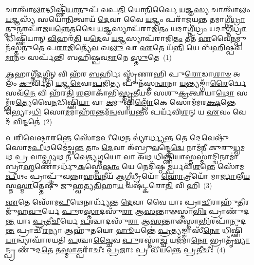 \setcounter{anuvakam}{0}
𑌚𑌾𑌤𑍍𑌵𑌾᳴\-\ul{𑌲𑌾}\-𑌦𑍍𑌧𑌿𑌷𑍍𑌣𑌿᳴\-\ul{𑌯𑌾}\-𑌨𑍁𑌪᳴ 𑌵𑌪\-\ul{𑌤𑌿} 𑌯𑍋\-\ul{𑌨𑌿}\-𑌰𑍍𑌵𑍈 \ul{𑌯}\-𑌜𑍍𑌞\-\ul{𑌸𑍍𑌯} 𑌚𑌾𑌤𑍍𑌵𑌾᳴𑌲𑌂 \ul{𑌯}\-𑌜𑍍𑌞𑌸𑍍𑌯᳴ 𑌸𑌯𑍋\-\ul{𑌨𑌿}\-𑌤𑍍𑌵𑌾𑌯᳴ \ul{𑌦𑍇}\-𑌵𑌾 𑌵𑍈 \ul{𑌯}\-𑌜𑍍𑌞𑌂 𑌪𑌰𑌾᳴𑌜𑌯\-\ul{𑌨𑍍𑌤} 𑌤𑌮𑌾𑌗𑍍𑌨𑍀॑\-\ul{𑌧𑍍𑌰𑌾}\-𑌤𑍍𑌪𑍁\-\ul{𑌨}\-𑌰𑌪𑌾᳴𑌜𑌯\-\ul{𑌨𑍍𑌨𑍇}\-𑌤𑌦𑍍𑌵𑍈 \ul{𑌯}\-𑌜𑍍𑌞𑌸𑍍𑌯𑌾𑌪᳴𑌰𑌾𑌜𑌿\-\ul{𑌤𑌂} 𑌯𑌦𑌾𑌗𑍍𑌨𑍀॑\-\ul{𑌧𑍍𑌰𑌂} 𑌯𑌦𑌾𑌗𑍍𑌨𑍀॑\-\ul{𑌧𑍍𑌰𑌾}\-𑌦𑍍𑌧𑌿𑌷𑍍𑌣𑌿᳴𑌯𑌾𑌨𑍍 \ul{𑌵𑌿}\-𑌹𑌰᳴\-\ul{𑌤𑌿} 𑌯\-\ul{𑌦𑍇}\-𑌵 \ul{𑌯}\-𑌜𑍍𑌞𑌸𑍍𑌯𑌾𑌪᳴𑌰𑌾𑌜𑌿\-\ul{𑌤𑌂} 𑌤𑌤᳴ \ul{𑌏}\-𑌵𑍈\-\ul{𑌨}\-𑌮𑍍𑌪𑍁𑌨᳴𑌸𑍍𑌤𑌨𑍁𑌤𑍇 𑌪\-\ul{𑌰𑌾}\-𑌜𑌿𑌤𑍍𑌯𑍇᳴\-\ul{𑌵} 𑌖\-\ul{𑌲𑍁} 𑌵𑌾 \ul{𑌏}\-𑌤𑍇 𑌯᳴\-\ul{𑌨𑍍𑌤𑌿} 𑌯𑍇 𑌬᳴𑌹𑌿𑌷𑍍𑌪𑌵\-\ul{𑌮𑌾}\-𑌨𑍞 𑌸𑌰𑍍𑌪᳴𑌨𑍍𑌤𑌿 𑌬𑌹𑌿𑌷𑍍𑌪𑌵\-\ul{𑌮𑌾}\-𑌨𑍇 \ul{𑌸𑍍𑌤𑍁}\-𑌤𑍇~(1)

\-\ul{𑌆}\-𑌹𑌾𑌗𑍍𑌨𑍀᳴\-\ul{𑌦}\-𑌗𑍍𑌨𑍀𑌨𑍍 𑌵𑌿 𑌹᳴𑌰 \ul{𑌬}\-𑌰𑍍\mbox{}𑌹𑌿𑌃 𑌸𑍍𑌤𑍃᳴𑌣𑌾𑌹𑌿 𑌪𑍁\-\ul{𑌰𑍋}\-𑌡𑌾\-\ul{𑌶𑌾}\-\-\ul{𑍞} 𑌅𑌲𑌂᳴ \ul{𑌕𑍁}\-𑌰𑍍𑌵𑌿𑌤𑌿᳴ \ul{𑌯}\-𑌜𑍍𑌞\-\ul{𑌮𑍇}\-𑌵𑌾\-\ul{𑌪}\-𑌜𑌿\-\ul{𑌤𑍍𑌯} 𑌪𑍁𑌨᳴𑌸𑍍𑌤\-\ul{𑌨𑍍𑌵𑌾}\-𑌨𑌾 \ul{𑌯}\-𑌨𑍍𑌤𑍍𑌯𑌙𑍍𑌗𑌾᳴\-\ul{𑌰𑍈}\-𑌰𑍍𑌦𑍍𑌵𑍇 𑌸𑌵᳴\-\ul{𑌨𑍇} 𑌵𑌿 𑌹᳴𑌰𑌤𑌿 \ul{𑌶}\-𑌲𑌾𑌕𑌾᳴𑌭𑌿\-\ul{𑌸𑍍𑌤𑍃}\-𑌤𑍀𑌯𑍞᳴ 𑌸𑌶𑍁\-\ul{𑌕𑍍𑌰}\-𑌤𑍍𑌵𑌾𑌯𑌾\-\ul{𑌥𑍋} 𑌸𑌮𑍍𑌭᳴𑌰\-\ul{𑌤𑍍𑌯𑍇}\-𑌵𑍈\-\ul{𑌨}\-𑌦𑍍𑌧𑌿𑌷𑍍𑌣𑌿᳴\-\ul{𑌯𑌾} 𑌵𑌾 \ul{𑌅}\-𑌮𑍁𑌷𑍍𑌮𑌿᳴\-\ul{𑌲𑍍𑌲𑍋𑌁}\-𑌕𑍇 𑌸𑍋𑌮᳴𑌮𑌰\-\ul{𑌕𑍍𑌷}\-𑌨𑍍𑌤𑍇𑌭𑍍𑌯𑍋\-𑌽\-\ul{𑌧𑌿} 𑌸𑍋\-\ul{𑌮}\-𑌮𑌾𑌹᳴\-\ul{𑌰}\-𑌨𑍍𑌤𑌮᳴\-\ul{𑌨𑍍𑌵}\-𑌵𑌾\-\ul{𑌯}\-𑌨𑍍𑌤𑌂 𑌪𑌰𑍍𑌯᳴𑌵𑌿\-\ul{𑌶}\-𑌨𑍍 𑌯 \ul{𑌏}\-𑌵𑌂 𑌵𑍇𑌦᳴ \ul{𑌵𑌿}\-𑌨𑍍𑌦𑌤𑍇॑~(2)

\-\ul{𑌪}\-\-\ul{𑌰𑌿}\-\-\ul{𑌵𑍇}\-𑌷𑍍𑌟𑌾\-\ul{𑌰}\-𑌨𑍍𑌤𑍇 𑌸𑍋᳴𑌮\-\ul{𑌪𑍀}\-𑌥𑍇\-\ul{𑌨} 𑌵𑍍𑌯𑌾॑𑌰𑍍𑌧𑍍𑌯\-\ul{𑌨𑍍𑌤} 𑌤𑍇 \ul{𑌦𑍇}\-𑌵𑍇𑌷𑍁᳴ 𑌸𑍋𑌮\-\ul{𑌪𑍀}\-𑌥𑌮𑍈॑𑌚𑍍𑌛\-\ul{𑌨𑍍𑌤} 𑌤𑌾𑌂 \ul{𑌦𑍇}\-𑌵𑌾 𑌅᳴𑌬𑍍𑌰𑍁\-\ul{𑌵}\-𑌨𑍍𑌦𑍍𑌵𑍇\-\ul{𑌦𑍍𑌵𑍇} 𑌨𑌾𑌮᳴𑌨𑍀 𑌕𑍁𑌰𑍁\-\ul{𑌧𑍍𑌵}\-𑌮\-\ul{𑌥} 𑌪𑍍𑌰 \ul{𑌵𑌾}\-𑌫𑍍𑌸𑍍𑌯\-\ul{𑌥} 𑌨 𑌵𑍇\-\ul{𑌤𑍍𑌯}\-𑌗𑍍𑌨\-\ul{𑌯𑍋} 𑌵𑌾 𑌅\-\ul{𑌥} 𑌧𑌿𑌷𑍍𑌣𑌿᳴\-\ul{𑌯𑌾}\-𑌸𑍍𑌤𑌸𑍍𑌮𑌾॑\-\ul{𑌦𑍍𑌦𑍍𑌵𑌿}\-𑌨𑌾𑌮𑌾॑ 𑌬𑍍𑌰𑌾\-\ul{𑌹𑍍𑌮}\-𑌣𑍋\-𑌽𑌰𑍍𑌧𑍁᳴\-\ul{𑌕}\-𑌸𑍍𑌤𑍇\-\ul{𑌷𑌾𑌂} 𑌯𑍇 𑌨𑍇𑌦𑌿᳴𑌷𑍍𑌠\-\ul{𑌮𑍍𑌪}\-𑌰𑍍𑌯𑌵𑌿᳴\-\ul{𑌶}\-𑌨𑍍𑌤𑍇 𑌸𑍋᳴𑌮\-\ul{𑌪𑍀}\-𑌥𑌂 𑌪𑍍𑌰𑌾𑌪𑍍𑌨𑍁᳴𑌵𑌨𑍍𑌨𑌾𑌹\-\ul{𑌵}\-𑌨𑍀𑌯᳴ 𑌆\-\ul{𑌗𑍍𑌨𑍀}\-𑌧𑍍𑌰𑍀𑌯𑍋᳴ \ul{𑌹𑍋}\-𑌤𑍍𑌰𑍀𑌯𑍋᳴ 𑌮𑌾\-\ul{𑌰𑍍𑌜𑌾}\-𑌲𑍀\-\ul{𑌯}\-𑌸𑍍𑌤\-\ul{𑌸𑍍𑌮𑌾}\-𑌤𑍍𑌤𑍇𑌷𑍁᳴ 𑌜𑍁𑌹𑍍𑌵𑌤𑍍𑌯\-\ul{𑌤𑌿}\-𑌹𑌾\-\ul{𑌯} 𑌵𑌷᳴𑌟𑍍𑌕𑌰𑍋\-\ul{𑌤𑌿} 𑌵𑌿 𑌹𑌿~(3)

\-\ul{𑌏}\-𑌤𑍇 𑌸𑍋᳴𑌮\-\ul{𑌪𑍀}\-𑌥𑍇𑌨𑌾𑌰𑍍𑌧𑍍𑌯᳴𑌨𑍍𑌤 \ul{𑌦𑍇}\-𑌵𑌾 𑌵𑍈 𑌯𑌾𑌃 𑌪𑍍𑌰𑌾\-\ul{𑌚𑍀}\-𑌰𑌾𑌹𑍁᳴\-\ul{𑌤𑍀}\-𑌰𑌜𑍁᳴𑌹\-\ul{𑌵𑍁}\-𑌰𑍍𑌯𑍇 \ul{𑌪𑍁}\-𑌰\-\ul{𑌸𑍍𑌤𑌾}\-𑌦𑌸𑍁᳴\-\ul{𑌰𑌾} 𑌆\-\ul{𑌸}\-𑌨𑍍𑌤𑌾𑍟𑌸𑍍𑌤𑌾\-\ul{𑌭𑌿𑌃} 𑌪𑍍𑌰𑌾𑌣𑍁᳴𑌦\-\ul{𑌨𑍍𑌤} 𑌯𑌾𑌃 \ul{𑌪𑍍𑌰}\-𑌤𑍀\-\ul{𑌚𑍀}\-𑌰𑍍𑌯𑍇 \ul{𑌪}\-𑌶𑍍𑌚𑌾𑌦𑌸𑍁᳴\-\ul{𑌰𑌾} 𑌆\-\ul{𑌸}\-𑌨𑍍𑌤𑌾𑍟𑌸𑍍𑌤𑌾\-\ul{𑌭𑌿}\-𑌰𑌪𑌾᳴𑌨𑍁𑌦\-\ul{𑌨𑍍𑌤} 𑌪𑍍𑌰𑌾𑌚𑍀᳴\-\ul{𑌰}\-𑌨𑍍𑌯𑌾 𑌆𑌹𑍁᳴𑌤𑌯𑍋 \ul{𑌹𑍂}\-𑌯𑌨𑍍𑌤𑍇॑ \ul{𑌪𑍍𑌰}\-𑌤𑍍𑌯𑌙𑍍𑌙𑌾𑌸𑍀᳴\-\ul{𑌨𑍋} 𑌧𑌿𑌷𑍍𑌣𑌿᳴\-\ul{𑌯𑌾}\-𑌨𑍍𑌵𑍍𑌯𑌾𑌘𑌾᳴𑌰𑌯𑌤𑌿 \ul{𑌪}\-𑌶𑍍𑌚𑌾\-\ul{𑌚𑍍𑌚𑍈}\-𑌵 \ul{𑌪𑍁}\-𑌰𑌸𑍍𑌤𑌾॑\-\ul{𑌚𑍍𑌚} 𑌯𑌜᳴𑌮𑌾\-\ul{𑌨𑍋} 𑌭𑍍𑌰𑌾𑌤𑍃᳴\-\ul{𑌵𑍍𑌯𑌾}\-𑌨𑍍𑌪𑍍𑌰 𑌣𑍁᳴𑌦\-\ul{𑌤𑍇} 𑌤\-\ul{𑌸𑍍𑌮𑌾}\-𑌤𑍍𑌪𑌰𑌾᳴𑌚𑍀𑌃 \ul{𑌪𑍍𑌰}\-𑌜𑌾𑌃 𑌪𑍍𑌰 𑌵𑍀᳴𑌯𑌨𑍍𑌤𑍇 \ul{𑌪𑍍𑌰}\-𑌤𑍀𑌚𑍀𑌃॑~(4)

